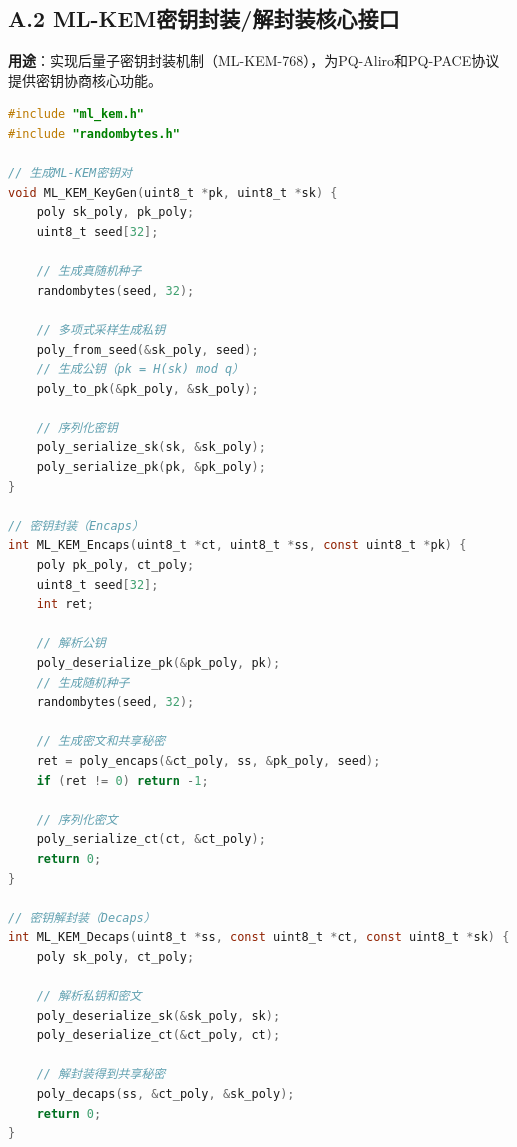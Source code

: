 \subsection*{A.2 ML-KEM密钥封装/解封装核心接口}
\textbf{用途}：实现后量子密钥封装机制（ML-KEM-768），为PQ-Aliro和PQ-PACE协议提供密钥协商核心功能。
\begin{lstlisting}[language=C, caption=ML-KEM核心接口实现]
#include "ml_kem.h"
#include "randombytes.h"

// 生成ML-KEM密钥对
void ML_KEM_KeyGen(uint8_t *pk, uint8_t *sk) {
    poly sk_poly, pk_poly;
    uint8_t seed[32];
    
    // 生成真随机种子
    randombytes(seed, 32);
    
    // 多项式采样生成私钥
    poly_from_seed(&sk_poly, seed);
    // 生成公钥（pk = H(sk) mod q）
    poly_to_pk(&pk_poly, &sk_poly);
    
    // 序列化密钥
    poly_serialize_sk(sk, &sk_poly);
    poly_serialize_pk(pk, &pk_poly);
}

// 密钥封装（Encaps）
int ML_KEM_Encaps(uint8_t *ct, uint8_t *ss, const uint8_t *pk) {
    poly pk_poly, ct_poly;
    uint8_t seed[32];
    int ret;

    // 解析公钥
    poly_deserialize_pk(&pk_poly, pk);
    // 生成随机种子
    randombytes(seed, 32);
    
    // 生成密文和共享秘密
    ret = poly_encaps(&ct_poly, ss, &pk_poly, seed);
    if (ret != 0) return -1;
    
    // 序列化密文
    poly_serialize_ct(ct, &ct_poly);
    return 0;
}

// 密钥解封装（Decaps）
int ML_KEM_Decaps(uint8_t *ss, const uint8_t *ct, const uint8_t *sk) {
    poly sk_poly, ct_poly;
    
    // 解析私钥和密文
    poly_deserialize_sk(&sk_poly, sk);
    poly_deserialize_ct(&ct_poly, ct);
    
    // 解封装得到共享秘密
    poly_decaps(ss, &ct_poly, &sk_poly);
    return 0;
}
\end{lstlisting}

